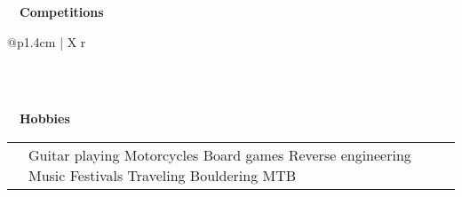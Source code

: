 \documentclass[a4paper, 11pt]{article}
\newcommand{\sectitle}[2]{\large{#1} \ \ \Large{\textbf{#2}}}
\begin{document}
	\begin{section}{\sectitle{\faTrophy}{Competitions}}
		\begin{tabularx}{\linewidth}{@{}p{1.4cm} | X r}
		\end{tabularx}
		\\ \\
	\end{section}
	\vspace{-3.5mm}


	\newcommand{\hobbies}[2]{
		\textsc{#1} & \multicolumn{2}{p{0.9\textwidth}}{\footnotesize{#2}} \\
	}

	\let\cleardoublepage\clearpage
	
	\begin{section}{\sectitle{\faMotorcycle}{Hobbies}}
		\begin{tabularx}{\linewidth}{@{}p{1.4cm} | X r}
			\hobbies{}{
			\normalsize 
			Guitar playing \hspace{6ex}
			Motorcycles \hspace{6ex}
			Board games \hspace{6ex}
			Reverse engineering \hspace{6ex}
			Music \hspace{6ex}
			Festivals \hspace{6ex}
			Traveling \hspace{6ex}
			Bouldering \hspace{6ex}
			MTB\hspace{6ex}
			}
		\end{tabularx}
	\end{section}
	\vspace{-3.5mm}
\end{document}
